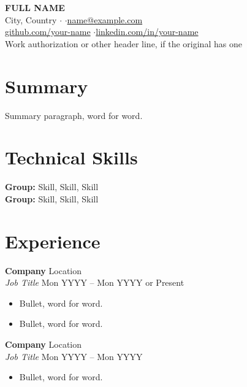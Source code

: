 \pagestyle{empty}

\begin{center}
    {\LARGE \textbf{{{FULL NAME}}}} \\ \vspace{2pt}
    {{City, Country}} \quad$\cdot$ \quad$\cdot$\quad \href{mailto:name@example.com}{name@example.com} \\
    \href{https://github.com/your-name}{github.com/your-name} \quad$\cdot$\quad \href{https://www.linkedin.com/in/your-name}{linkedin.com/in/your-name} \\
    {{Work authorization or other header line, if the original has one}}
\end{center}

\section*{Summary}
{{Summary paragraph, word for word.}}

\section*{Technical Skills}
\textbf{{{Group}}:} {{Skill}}, {{Skill}}, {{Skill}} \\
\textbf{{{Group}}:} {{Skill}}, {{Skill}}, {{Skill}}

\section*{Experience}

\textbf{{{Company}}} \hfill {{Location}} \\
\textit{{{Job Title}}} \hfill {{Mon YYYY}} -- {{Mon YYYY or Present}}
\begin{itemize}
    \item {{Bullet, word for word.}}
    \item {{Bullet, word for word.}}
\end{itemize}

\vspace{6pt}
\textbf{{{Company}}} \hfill {{Location}} \\
\textit{{{Job Title}}} \hfill {{Mon YYYY}} -- {{Mon YYYY}}
\begin{itemize}
    \item {{Bullet, word for word.}}
\end{itemize}

